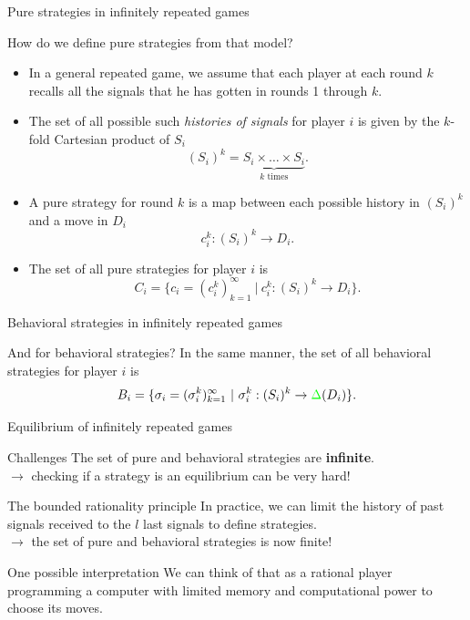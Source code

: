 \begin{frame}{Pure strategies in infinitely repeated games}
    \begin{block}{How do we define pure strategies from that model?}
        \begin{itemize}[<+->]
            \item In a general repeated game, we assume that each player at each round $k$ recalls
            all the signals that he has gotten in rounds 1 through $k$.
            \item The set of all possible such \textit{histories of signals} for player $i$ is given by the
            $k$-fold Cartesian product of $S_i$
            \[ (S_i)^k = \underbrace{S_i \times \dots \times S_i}_{k\text{ times}}.\]
            \item A pure strategy for round $k$ is a map between each possible history in $(S_i)^k$
            and a move in $D_i$
            \[ c^k_i: (S_i)^k \to D_i. \]
            \item The set of all pure strategies for player $i$ is
            \[ C_i = \{c_i = (c_i^k)_{k=1}^\infty~|~ c_i^k: (S_i)^k \to D_i \}. \]
        \end{itemize}
    \end{block}
\end{frame}

\begin{frame}{Behavioral strategies in infinitely repeated games}
    \begin{block}{And for behavioral strategies?}
        In the same manner, the set of all behavioral strategies for player $i$ is
        \[ B_i = \{\sigma_i = (\sigma_i^k)_{k=1}^\infty~|~ \sigma_i^k: (S_i)^k
        \to {\color{green}\Delta}(D_i) \}. \]
    \end{block}
\end{frame}

\begin{frame}{Equilibrium of infinitely repeated games}
    \begin{alertblock}{Challenges}
        The set of pure and behavioral strategies are \textbf{infinite}.\\
        {\color{orange}$\to$ checking if a strategy is an equilibrium can be very hard!}
    \end{alertblock}

    \pause
    \begin{exampleblock}{The bounded rationality principle}
        In practice, we can limit the history of past signals received to the $l$ last signals
        to define strategies.\\
        {\color{green}$\to$ the set of pure and behavioral strategies is now finite!}
    \end{exampleblock}

    \vspace{0.5cm}
    \begin{block}{One possible interpretation}
        We can think of that as a rational player programming a computer with limited memory and
        computational power to choose its moves.
    \end{block}

\end{frame}


